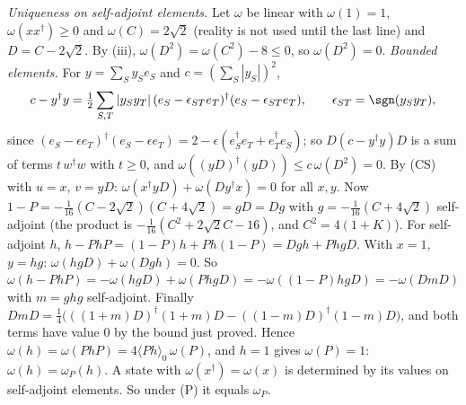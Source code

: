 \emph{Uniqueness on self-adjoint elements.} Let $\omega$ be linear with $\omega(1) = 1$, $\omega(xx^{\dagger}) \ge 0$ and $\omega(C) = 2\sqrt{2}$ (reality is not used until the last line) and $D = C - 2\sqrt{2}$. By (iii), $\omega(D^{2}) = \omega(C^{2}) - 8 \le 0$, so $\omega(D^{2}) = 0$. \emph{Bounded elements.} For $y = \sum_{S}y_{S}e_{S}$ and $c = (\sum_{S}|y_{S}|)^{2}$,
\[
c - y^{\dagger}y = \tfrac12\sum_{S,T}|y_{S}y_{T}|\,(e_{S} - \epsilon_{ST}e_{T})^{\dagger}(e_{S} - \epsilon_{ST}e_{T}), \qquad \epsilon_{ST} = \sgn(y_{S}y_{T}),
\]
since $(e_{S} - \epsilon e_{T})^{\dagger}(e_{S} - \epsilon e_{T}) = 2 - \epsilon(e_{S}^{\dagger}e_{T} + e_{T}^{\dagger}e_{S})$; so $D(c - y^{\dagger}y)D$ is a sum of terms $t\,w^{\dagger}w$ with $t \ge 0$, and $\omega((yD)^{\dagger}(yD)) \le c\,\omega(D^{2}) = 0$. By (CS) with $u = x$, $v = yD$: $\omega(x^{\dagger}yD) + \omega(Dy^{\dagger}x) = 0$ for all $x, y$. Now $1 - P = -\tfrac{1}{16}(C - 2\sqrt{2})(C + 4\sqrt{2}) = gD = Dg$ with $g = -\tfrac{1}{16}(C + 4\sqrt{2})$ self-adjoint (the product is $-\tfrac{1}{16}(C^{2} + 2\sqrt{2}C - 16)$, and $C^{2} = 4(1 + K)$). For self-adjoint $h$, $h - PhP = (1 - P)h + Ph(1 - P) = Dgh + PhgD$. With $x = 1$, $y = hg$: $\omega(hgD) + \omega(Dgh) = 0$. So $\omega(h - PhP) = -\omega(hgD) + \omega(PhgD) = -\omega((1 - P)hgD) = -\omega(DmD)$ with $m = ghg$ self-adjoint. Finally $DmD = \tfrac14\bigl(((1 + m)D)^{\dagger}(1 + m)D - ((1 - m)D)^{\dagger}(1 - m)D\bigr)$, and both terms have value $0$ by the bound just proved. Hence $\omega(h) = \omega(PhP) = 4\langle Ph\rangle_{0}\,\omega(P)$, and $h = 1$ gives $\omega(P) = 1$: $\omega(h) = \omega_{P}(h)$. A state with $\omega(x^{\dagger}) = \omega(x)$ is determined by its values on self-adjoint elements. So under (P) it equals $\omega_{P}$.

